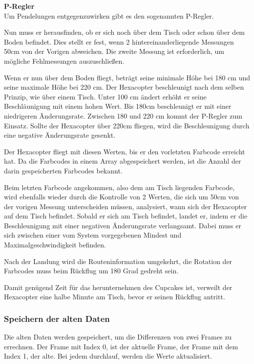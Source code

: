 \begin{itemize}
    \textbf{P-Regler}\\
    Um Pendelungen entgegenzuwirken gibt es den sogenannten P-Regler.

    Nun muss er herausfinden, ob er sich noch über dem Tisch oder schon über dem Boden befindet. Dies stellt er fest, wenn 2 hintereinanderliegende Messungen 50cm von der Vorigen abweichen. Die zweite Messung ist erforderlich, um mögliche Fehlmessungen auszuschließen.

    Wenn er nun über dem Boden fliegt, beträgt seine minimale Höhe bei 180 cm und seine maximale Höhe bei 220 cm.
    Der Hexacopter beschleunigt nach dem selben Prinzip, wie über einem Tisch. Unter 100 cm ändert erhöht er seine Beschläunigung mit einem hohen Wert. Bis 180cm beschleunigt er mit einer niedrigeren Änderungsrate. Zwischen 180 und 220 cm kommt der P-Regler zum Einsatz. Sollte der Hexacopter über 220cm fliegen, wird die Beschleunigung durch eine negative Änderungsrate gesenkt.

    Der Hexacopter fliegt mit diesen Werten, bis er den vorletzten Farbcode erreicht hat. Da die Farbcodes in einem Array abgespeichert werden, ist die Anzahl der darin gespeicherten Farbcodes bekannt. 

    Beim letzten Farbcode angekommen, also dem am Tisch liegenden Farbcode, wird ebenfalls wieder durch die Kontrolle von 2 Werten, die sich um 50cm von der vorigen Messung unterscheiden müssen, analysiert, wann sich der Hexacopter auf dem Tisch befindet. Sobald er sich am Tisch befindet, landet er, indem er die Beschleunigung mit einer negativen Änderungsrate verlangsamt. Dabei muss er sich zwischen einer vom System vorgegebenen Mindest und Maximalgeschwindigkeit befinden. 

    Nach der Landung wird die Routeninformation umgekehrt, die Rotation der Farbcodes muss beim Rückflug um 180 Grad gedreht sein.

    Damit genügend Zeit für das herunternehmen des Cupcakes ist, verweilt der Hexacopter eine halbe Minute am Tisch, bevor er seinen Rückflug antritt.

    \subsubsection{Speichern der alten Daten}
    Die alten Daten werden gespeichert, um die Differenzen von zwei Frames zu errechnen. Der Frame mit Index 0, ist der aktuelle Frame, der Frame mit dem Index 1, der alte. Bei jedem durchlauf, werden die Werte aktualisiert.



\end{itemize}
